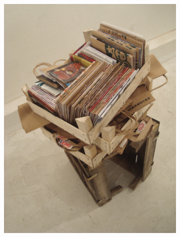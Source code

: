 \begin{figure}
  \begin{subfigure}[b]{0.48\textwidth}
    \includegraphics[width=\textwidth]{project_graphics/torun3.jpg}
  \end{subfigure}
  \hfill
  \begin{subfigure}[b]{0.48\textwidth}

\end{subfigure}
\end{figure}
